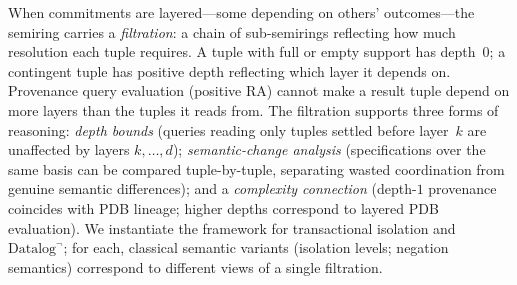 \documentclass[acmsmall,review,anonymous]{acmart}
\theoremstyle{remark}
\numberwithin{definition}{section}
\numberwithin{theorem}{section}
\numberwithin{lemma}{section}
\numberwithin{corollary}{section}
\numberwithin{remark}{section}
\numberwithin{example}{section}
\numberwithin{observation}{section}
\numberwithin{assumption}{section}
\begin{document}
When commitments are layered---some depending on others' outcomes---the
semiring carries a \emph{filtration}: a chain of sub-semirings
reflecting how much resolution each tuple requires.
A tuple with full or empty support has depth~$0$; a contingent tuple
has positive depth reflecting which layer it depends on.
Provenance query evaluation (positive RA) cannot make a result tuple
depend on more layers than the tuples it reads from.
The filtration supports three forms of reasoning:
\emph{depth bounds} (queries reading only tuples settled before
layer~$k$ are unaffected by layers $k, \ldots, d$);
\emph{semantic-change analysis}
(specifications over the same basis can be compared tuple-by-tuple,
separating wasted coordination from genuine semantic differences); and
a \emph{complexity connection} (depth-$1$ provenance coincides with
PDB lineage; higher depths correspond to layered PDB evaluation).
We instantiate the framework for transactional isolation and
$\mbox{Datalog}^\neg$; for each, classical semantic variants
  (isolation levels; negation semantics) correspond to different views
  of a single filtration.
\end{document}

